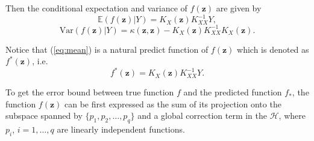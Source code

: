 \documentclass[preprint,review,sort&compress,3p]{elsarticle}
\begin{document}
{  Then} the conditional expectation and variance of $f(\boldsymbol{z})$ are given by 
\begin{equation}
	\label{eq:mean}
	\mathbb{E} ( f(\boldsymbol{z}) \vert Y ) = K_X(\boldsymbol{z}) K_{XX}^{-1} Y,
\end{equation}
\begin{equation}
	\label{eq:variance}
	\text{Var}( f(\boldsymbol{z}) \vert Y ) = \kappa(\boldsymbol{z},\boldsymbol{z})-K_X(\boldsymbol{z}) K_{XX}^{-1} K_X(\boldsymbol{z}). 
\end{equation}



Notice that (\ref{eq:mean}) is a natural predict function of $f(\boldsymbol{z})$ which is denoted as  $f^*(\boldsymbol{z})$, i.e. 
$$
f^*(\boldsymbol{z}) = K_X(\boldsymbol{z}) K_{XX}^{-1} Y.
$$


To get the error bound between true function $f$ and the predicted function $f_*$, 
the function $f(\boldsymbol{z})$ can be first expressed as the sum of its projection onto the subspace spanned by $\{p_1,p_2,\dots, p_q\}$ and a global correction term in the $\mathcal{H}$, where $p_i$, $i = 1,\dots,q$ are linearly independent functions. 
\end{document}
